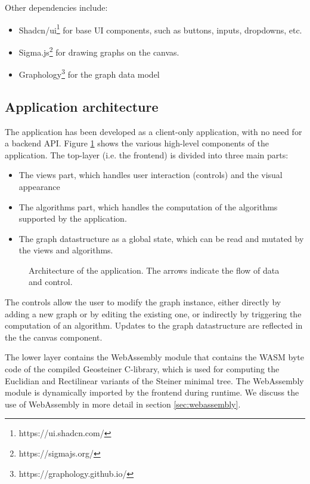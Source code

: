 \documentclass{l4proj}
\begin{document}
Other dependencies include:
\begin{itemize}
    \item Shadcn/ui\footnote{https://ui.shadcn.com/} for base UI components, such as buttons, inputs, dropdowns, etc.
    \item Sigma.js\footnote{https://sigmajs.org/} for drawing graphs on the canvas.
    \item Graphology\footnote{https://graphology.github.io/} for the graph data model
\end{itemize}

\subsection{Application architecture}
The application has been developed as a client-only application, with no need for a backend API. Figure \ref{fig:architecture} shows the various high-level components of the application. The top-layer (i.e. the frontend) is divided into three main parts:
\begin{itemize}
    \item The views part, which handles user interaction (controls) and the visual appearance
    \item The algorithms part, which handles the computation of the algorithms supported by the application.
    \item The graph datastructure as a global state, which can be read and mutated by the views and algorithms.
\end{itemize}

\begin{figure}[h]
    \centering
    
    \caption{Architecture of the application. The arrows indicate the flow of data and control.}
    \label{fig:architecture}
\end{figure}

The controls allow the user to modify the graph instance, either directly by adding a new graph or by editing the existing one, or indirectly by triggering the computation of an algorithm.
Updates to the graph datastructure are reflected in the the canvas component.

The lower layer contains the WebAssembly module that contains the WASM byte code of the compiled Geosteiner C-library, which is used for computing the Euclidian and Rectilinear variants of the Steiner minimal tree. The WebAssembly module is dynamically imported by the frontend during runtime.
We discuss the use of WebAssembly in more detail in section \ref{sec:webassembly}.
\end{document}
